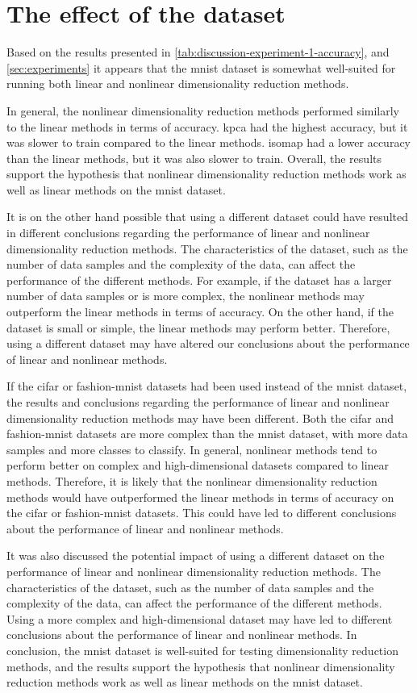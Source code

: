 \section{The effect of the dataset}\label{sec:discussion-of-data}
Based on the results presented in \autoref{tab:discussion-experiment-1-accuracy}, and \autoref{sec:experiments} it appears that the \gls{mnist} dataset is somewhat well-suited for running both linear and nonlinear dimensionality reduction methods.

In general, the nonlinear dimensionality reduction methods performed similarly to the linear methods in terms of accuracy. \gls{kpca} had the highest accuracy, but it was slower to train compared to the linear methods. \gls{isomap} had a lower accuracy than the linear methods, but it was also slower to train. Overall, the results support the hypothesis that nonlinear dimensionality reduction methods work as well as linear methods on the \gls{mnist} dataset.

It is on the other hand possible that using a different dataset could have resulted in different conclusions regarding the performance of linear and nonlinear dimensionality reduction methods. The characteristics of the dataset, such as the number of data samples and the complexity of the data, can affect the performance of the different methods. For example, if the dataset has a larger number of data samples or is more complex, the nonlinear methods may outperform the linear methods in terms of accuracy. On the other hand, if the dataset is small or simple, the linear methods may perform better. Therefore, using a different dataset may have altered our conclusions about the performance of linear and nonlinear methods.

If the \gls{cifar} or \gls{fashion-mnist} datasets had been used instead of the \gls{mnist} dataset, the results and conclusions regarding the performance of linear and nonlinear dimensionality reduction methods may have been different. Both the \gls{cifar} and \gls{fashion-mnist} datasets are more complex than the \gls{mnist} dataset, with more data samples and more classes to classify. In general, nonlinear methods tend to perform better on complex and high-dimensional datasets compared to linear methods. Therefore, it is likely that the nonlinear dimensionality reduction methods would have outperformed the linear methods in terms of accuracy on the \gls{cifar} or \gls{fashion-mnist} datasets. This could have led to different conclusions about the performance of linear and nonlinear methods.

It was also discussed the potential impact of using a different dataset on the performance of linear and nonlinear dimensionality reduction methods. The characteristics of the dataset, such as the number of data samples and the complexity of the data, can affect the performance of the different methods. Using a more complex and high-dimensional dataset may have led to different conclusions about the performance of linear and nonlinear methods. In conclusion, the \gls{mnist} dataset is well-suited for testing dimensionality reduction methods, and the results support the hypothesis that nonlinear dimensionality reduction methods work as well as linear methods on the \gls{mnist} dataset.